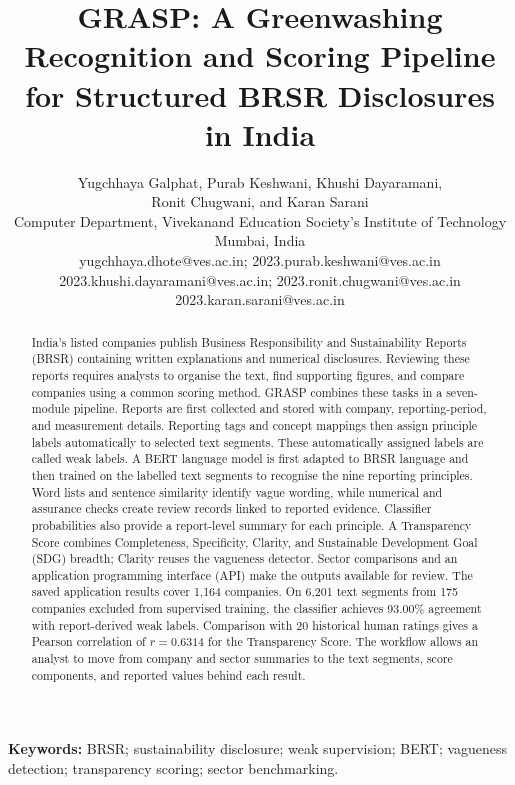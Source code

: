 \documentclass[11pt,a4paper,onecolumn]{article}
\title{\textbf{GRASP: A Greenwashing Recognition and Scoring Pipeline\\for Structured BRSR Disclosures in India}}
\author{\normalsize Yugchhaya Galphat, Purab Keshwani, Khushi Dayaramani,\\
\normalsize Ronit Chugwani, and Karan Sarani\\[5pt]
\small Computer Department, Vivekanand Education Society's Institute of Technology\\
\small Mumbai, India\\[3pt]
\footnotesize yugchhaya.dhote@ves.ac.in; 2023.purab.keshwani@ves.ac.in\\
\footnotesize 2023.khushi.dayaramani@ves.ac.in; 2023.ronit.chugwani@ves.ac.in\\
\footnotesize 2023.karan.sarani@ves.ac.in}
\date{}
\begin{document}
\maketitle
\begin{abstract}
India's listed companies publish Business Responsibility and Sustainability Reports (BRSR) containing written explanations and numerical disclosures. Reviewing these reports requires analysts to organise the text, find supporting figures, and compare companies using a common scoring method. GRASP combines these tasks in a seven-module pipeline. Reports are first collected and stored with company, reporting-period, and measurement details. Reporting tags and concept mappings then assign principle labels automatically to selected text segments. These automatically assigned labels are called weak labels. A BERT language model is first adapted to BRSR language and then trained on the labelled text segments to recognise the nine reporting principles. Word lists and sentence similarity identify vague wording, while numerical and assurance checks create review records linked to reported evidence. Classifier probabilities also provide a report-level summary for each principle. A Transparency Score combines Completeness, Specificity, Clarity, and Sustainable Development Goal (SDG) breadth; Clarity reuses the vagueness detector. Sector comparisons and an application programming interface (API) make the outputs available for review. The saved application results cover 1,164 companies. On 6,201 text segments from 175 companies excluded from supervised training, the classifier achieves 93.00\% agreement with report-derived weak labels. Comparison with 20 historical human ratings gives a Pearson correlation of $r=0.6314$ for the Transparency Score. The workflow allows an analyst to move from company and sector summaries to the text segments, score components, and reported values behind each result.
\end{abstract}
\noindent\textbf{Keywords:} BRSR; sustainability disclosure; weak supervision; BERT; vagueness detection; transparency scoring; sector benchmarking.









\end{document}
